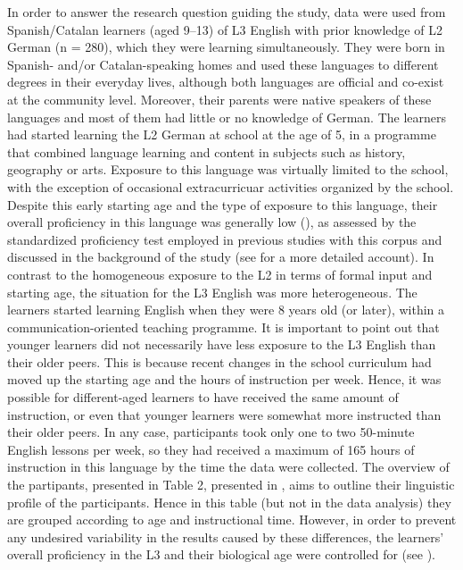 \documentclass[output=paper,modfonts,nonflat, newtxmath]{langsci/langscibook}
\begin{document}
In order to answer the research question guiding the study, data were used from Spanish/Catalan learners (aged 9--13) of L3 English with prior knowledge of L2 German ({n} = 280), which they were learning simultaneously. They were born in Spanish- and/or Catalan-speaking homes and used these languages to different degrees in their everyday lives, although both languages are official and co-exist at the community level. Moreover, their parents were native speakers of these languages and most of them had little or no knowledge of German. The learners had started learning the L2 German at school at the age of 5, in a programme that combined language learning and content in subjects such as history, geography or arts. Exposure to this language was virtually limited to the school, with the exception of occasional extracurricuar activities organized by the school. Despite this early starting age and the type of exposure to this language, their overall proficiency in this language was generally low (\citealt{SánchezBardel2016}), as assessed by the standardized proficiency test employed in previous studies with this corpus and discussed in the background of the study (see \citealt{SánchezBardel2017} for a more detailed account). In contrast to the homogeneous exposure to the L2 in terms of formal input and starting age, the situation for the L3 English was more heterogeneous. The learners started learning English when they were 8 years old (or later), within a communication-oriented teaching programme. It is important to point out that younger learners did not necessarily have less exposure to the L3 English than their older peers. This is because recent changes in the school curriculum had moved up the starting age and the hours of instruction per week. Hence, it was possible for different-aged learners to have received the same amount of instruction, or even that younger learners were somewhat more instructed than their older peers. In any case, participants took only one to two 50-minute English lessons per week, so they had received a maximum of 165 hours of instruction in this language by the time the data were collected. The overview of the partipants, presented in Table 2, presented in , aims to outline their linguistic profile of the participants. Hence in this table (but not in the data analysis) they are grouped according to age and instructional time. However, in order to prevent any undesired variability in the results caused by these differences, the learners’ overall proficiency in the L3 and their biological age were controlled for (see ).
\end{document}
